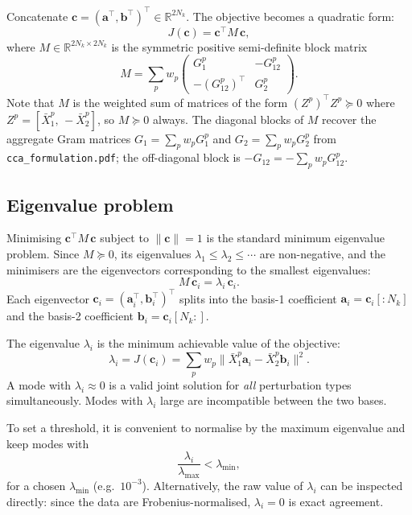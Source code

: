 \documentclass[a4paper,11pt]{article}
\newcommand{\va}{\bm{a}}
\newcommand{\vb}{\bm{b}}
\newcommand{\vc}{\bm{c}}
\newcommand{\Xn}[2]{\bar{X}_{#1}^{#2}}
\newcommand{\Gb}[1]{G_{#1}}
\newcommand{\Nk}{N_k}
\theoremstyle{plain}
\begin{document}
Concatenate $\vc = (\va^\top, \vb^\top)^\top \in \mathbb{R}^{2\Nk}$.
The objective becomes a quadratic form:
\begin{equation}
    J(\vc) = \vc^\top M\,\vc,
    \label{eq:quadratic}
\end{equation}
where $M \in \mathbb{R}^{2\Nk\times 2\Nk}$ is the symmetric positive semi-definite
block matrix
\begin{equation}
    M = \sum_p w_p
    \begin{pmatrix}
        \Gb{1}^p & -\Gb{12}^p \\[4pt]
        -(\Gb{12}^p)^\top & \Gb{2}^p
    \end{pmatrix}.
    \label{eq:M}
\end{equation}
Note that $M$ is the weighted sum of matrices of the form
$(Z^p)^\top Z^p \succeq 0$ where $Z^p = [\Xn{1}{p},\,-\Xn{2}{p}]$,
so $M \succeq 0$ always.
The diagonal blocks of $M$ recover the aggregate Gram matrices
$\Gb{1} = \sum_p w_p \Gb{1}^p$ and $\Gb{2} = \sum_p w_p \Gb{2}^p$
from \texttt{cca\_formulation.pdf}; the off-diagonal block is
$-\Gb{12} = -\sum_p w_p \Gb{12}^p$.

\subsection{Eigenvalue problem}
\label{sec:eigen}

Minimising $\vc^\top M\,\vc$ subject to $\|\vc\|=1$ is the standard minimum
eigenvalue problem.
Since $M \succeq 0$, its eigenvalues $\lambda_1 \leq \lambda_2 \leq \cdots$
are non-negative, and the minimisers are the eigenvectors corresponding to the
smallest eigenvalues:
\begin{equation}
    M\,\vc_i = \lambda_i\,\vc_i.
    \label{eq:eig}
\end{equation}
Each eigenvector $\vc_i = (\va_i^\top, \vb_i^\top)^\top$ splits into the
basis-1 coefficient $\va_i = \vc_i[:N_k]$ and the basis-2 coefficient
$\vb_i = \vc_i[N_k:]$.

The eigenvalue $\lambda_i$ is the minimum achievable value of the objective:
\begin{equation}
    \lambda_i = J(\vc_i) = \sum_p w_p \lVert\Xn{1}{p}\va_i - \Xn{2}{p}\vb_i\rVert^2.
\end{equation}
A mode with $\lambda_i \approx 0$ is a valid joint solution for \emph{all}
perturbation types simultaneously.
Modes with $\lambda_i$ large are incompatible between the two bases.

To set a threshold, it is convenient to normalise by the maximum eigenvalue
and keep modes with
\begin{equation}
    \frac{\lambda_i}{\lambda_{\max}} < \lambda_{\min},
    \label{eq:threshold}
\end{equation}
for a chosen $\lambda_{\min}$ (e.g.\ $10^{-3}$).
Alternatively, the raw value of $\lambda_i$ can be inspected directly: since
the data are Frobenius-normalised, $\lambda_i = 0$ is exact agreement.
\end{document}
